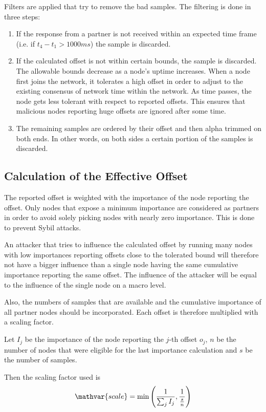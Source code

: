 Filters are applied that try to remove the bad samples. The filtering is done in three steps:
\begin{enumerate}
	\item{If the response from a partner is not received within an expected time frame (i.e. if $t_4-t_1 > 1000ms$) the sample is discarded.}
	\item{
		If the calculated offset is not within certain bounds, the sample is discarded.
		The allowable bounds decrease as a node's uptime increases.
		When a node first joins the network, it tolerates a high offset in order to adjust to the existing consensus of network time within the network.
		As time passes, the node gets less tolerant with respect to reported offsets.
		This ensures that malicious nodes reporting huge offsets are ignored after some time.
	}
	\item{
		The remaining samples are ordered by their offset and then alpha trimmed on both ends.
		In other words, on both sides a certain portion of the samples is discarded.
	}
\end{enumerate}

\subsection{Calculation of the Effective Offset}

The reported offset is weighted with the importance of the node reporting the offset.
Only nodes that expose a minimum importance are considered as partners in order to avoid solely picking nodes with nearly zero importance.
This is done to prevent Sybil attacks.

An attacker that tries to influence the calculated offset by running many nodes with low importances reporting offsets close to the tolerated bound will therefore not have a bigger influence than a single node having the same cumulative importance reporting the same offset.
The influence of the attacker will be equal to the influence of the single node on a macro level.

Also, the numbers of samples that are available and the cumulative importance of all partner nodes should be incorporated.
Each offset is therefore multiplied with a scaling factor.

Let $I_j$ be the importance of the node reporting the $j$-th offset $o_j$,
$n$ be the number of nodes that were eligible for the last importance calculation and $s$ be the number of samples.

Then the scaling factor used is
$$ \mathvar{scale} = \min\left(\frac{1}{\sum_j I_j}, \frac{1}{\frac{s}{n}}\right)$$

